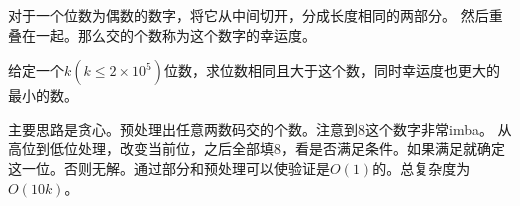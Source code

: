 \begin{prob}
	对于一个位数为偶数的数字，将它从中间切开，分成长度相同的两部分。
	然后重叠在一起。那么交的个数称为这个数字的幸运度。\par
	给定一个$k(k \le 2 \times 10^5)$位数，求位数相同且大于这个数，同时幸运度也更大的最小的数。
\end{prob}

\begin{sol}
	主要思路是贪心。预处理出任意两数码交的个数。注意到8这个数字非常imba。
	从高位到低位处理，改变当前位，之后全部填8，看是否满足条件。如果满足就确定这一位。否则无解。通过部分和预处理可以使验证是$O(1)$的。总复杂度为$O(10k)$。
\end{sol}
